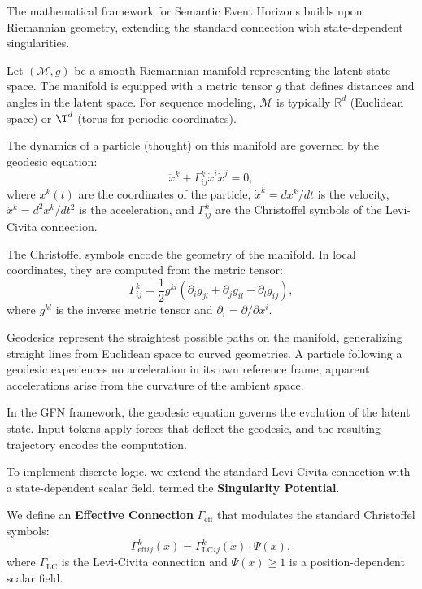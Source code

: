 \documentclass[12pt,letterpaper,twoside]{article}
\newcommand{\R}{\mathbb{R}}
\begin{document}
The mathematical framework for Semantic Event Horizons builds upon Riemannian geometry, extending the standard connection with state-dependent singularities.

Let $(\mathcal{M}, g)$ be a smooth Riemannian manifold representing the latent state space. The manifold is equipped with a metric tensor $g$ that defines distances and angles in the latent space. For sequence modeling, $\mathcal{M}$ is typically $\R^d$ (Euclidean space) or $\T^d$ (torus for periodic coordinates).

The dynamics of a particle (thought) on this manifold are governed by the geodesic equation:
\begin{equation}
\ddot{x}^k + \Gamma^k_{ij} \dot{x}^i \dot{x}^j = 0,
\end{equation}
where $x^k(t)$ are the coordinates of the particle, $\dot{x}^k = dx^k/dt$ is the velocity, $\ddot{x}^k = d^2x^k/dt^2$ is the acceleration, and $\Gamma^k_{ij}$ are the Christoffel symbols of the Levi-Civita connection.

The Christoffel symbols encode the geometry of the manifold. In local coordinates, they are computed from the metric tensor:
\begin{equation}
\Gamma^k_{ij} = \frac{1}{2} g^{kl} \left(\partial_i g_{jl} + \partial_j g_{il} - \partial_l g_{ij}\right),
\end{equation}
where $g^{kl}$ is the inverse metric tensor and $\partial_i = \partial/\partial x^i$.

Geodesics represent the straightest possible paths on the manifold, generalizing straight lines from Euclidean space to curved geometries. A particle following a geodesic experiences no acceleration in its own reference frame; apparent accelerations arise from the curvature of the ambient space.

In the GFN framework, the geodesic equation governs the evolution of the latent state. Input tokens apply forces that deflect the geodesic, and the resulting trajectory encodes the computation.

To implement discrete logic, we extend the standard Levi-Civita connection with a state-dependent scalar field, termed the \textbf{Singularity Potential}.

We define an \textbf{Effective Connection} $\Gamma_{\text{eff}}$ that modulates the standard Christoffel symbols:
\begin{equation}
\Gamma_{\text{eff}}^k_{ij}(x) = \Gamma_{\text{LC}}^k_{ij}(x) \cdot \Psi(x),
\end{equation}
where $\Gamma_{\text{LC}}$ is the Levi-Civita connection and $\Psi(x) \geq 1$ is a position-dependent scalar field.
\end{document}
